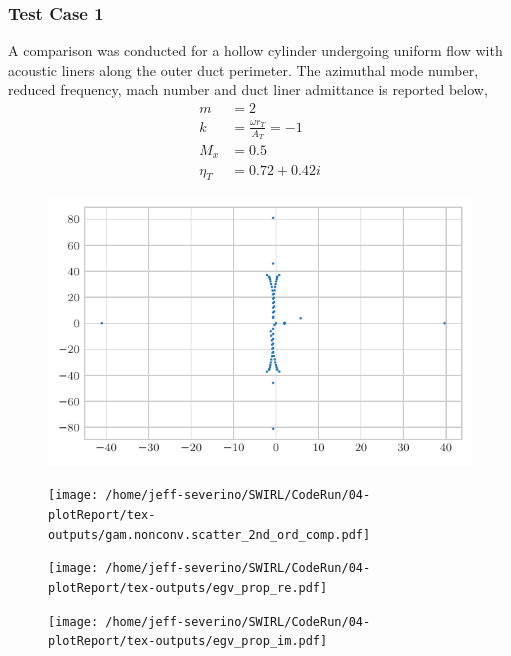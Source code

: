 \subsubsection{Test Case 1}
A comparison was conducted for a hollow cylinder undergoing uniform flow with
acoustic liners along the outer duct perimeter. The azimuthal mode number, reduced 
frequency, mach number and duct liner admittance is reported below,
\begin{align*}
    m &= 2 \\
    k &= \frac{\omega r_T}{A_T} = -1 \\
    M_x &= 0.5 \\
    \eta_T &= 0.72 + 0.42i
\end{align*} 
\begin{figure}[h!]
    \centering
    \includegraphics[width=\textwidth]{Chapter-5-Results/tex-outputs/gam.acc.scatter.Table4.3.pdf}
\end{figure}

\begin{figure}[h!]
    \centering
    \texttt{[image: /home/jeff-severino/SWIRL/CodeRun/04-plotReport/tex-outputs/gam.nonconv.scatter\_2nd\_ord\_comp.pdf]}
\end{figure}

\begin{figure}[h!]
    \centering
    \texttt{[image: /home/jeff-severino/SWIRL/CodeRun/04-plotReport/tex-outputs/egv\_prop\_re.pdf]}
    \label{fig:prop_re}
\end{figure}

\begin{figure}[h!]
    \centering
    \texttt{[image: /home/jeff-severino/SWIRL/CodeRun/04-plotReport/tex-outputs/egv\_prop\_im.pdf]}
    \label{fig:prop_im}
\end{figure}

